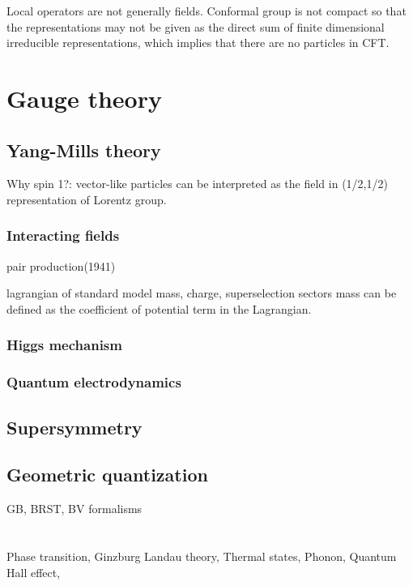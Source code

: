 \documentclass{../../large}
\begin{document}
Local operators are not generally fields.
Conformal group is not compact so that the representations may not be given as the direct sum of finite dimensional irreducible representations, which implies that there are no particles in CFT.




\part{Gauge theory}

\chapter{Yang-Mills theory}


Why spin 1?: vector-like particles can be interpreted as the field in (1/2,1/2) representation of Lorentz group.

\section{Interacting fields}
pair production(1941)

lagrangian of standard model
mass, charge, superselection sectors
mass can be defined as the coefficient of potential term in the Lagrangian.

\section{Higgs mechanism}

\section{Quantum electrodynamics}



\chapter{Supersymmetry}


\chapter{Geometric quantization}
GB, BRST, BV formalisms


\part{}

\chapter{}
Phase transition,
Ginzburg Landau theory,
Thermal states,
Phonon,
Quantum Hall effect,

\chapter{}

\chapter{}




\part{}
\end{document}
